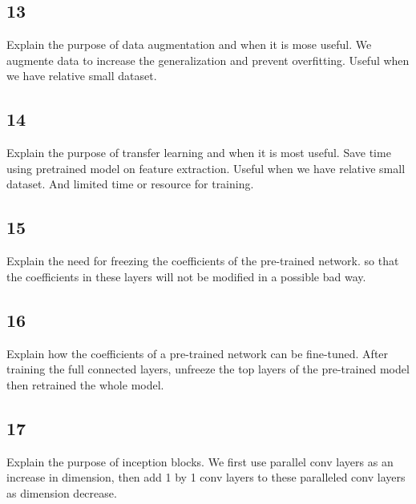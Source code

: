 \documentclass{article}
\begin{document}
\subsection*{13}
\begin{myleftlinebox}
    Explain the purpose of data augmentation and when it is mose useful.
    \tcbline
    We augmente data to increase the generalization and prevent overfitting. Useful when we have relative small dataset.
\end{myleftlinebox}
\subsection*{14}
\begin{myleftlinebox}
    Explain the purpose of transfer learning and when it is most useful.
    \tcbline
    Save time using pretrained model on feature extraction. Useful when we have relative small dataset. And limited time or resource for training.
\end{myleftlinebox}

\subsection*{15}
\begin{myleftlinebox}
    Explain the need for freezing the coefficients of the pre-trained network.
    \tcbline
    so that the coefficients in these layers will not be modified in a possible bad way.
\end{myleftlinebox}
\subsection*{16}
\begin{myleftlinebox}
    Explain how the coefficients of a pre-trained network can be fine-tuned.
    \tcbline
    After training the full connected layers, unfreeze the top layers of the pre-trained model then retrained the whole model.
\end{myleftlinebox}
\subsection*{17}
\begin{myleftlinebox}
    Explain the purpose of inception blocks.
    \tcbline
    We first use parallel conv layers as an increase in dimension, then add 1 by 1 conv layers to these paralleled conv layers as dimension decrease.
\end{myleftlinebox}
\end{document}
